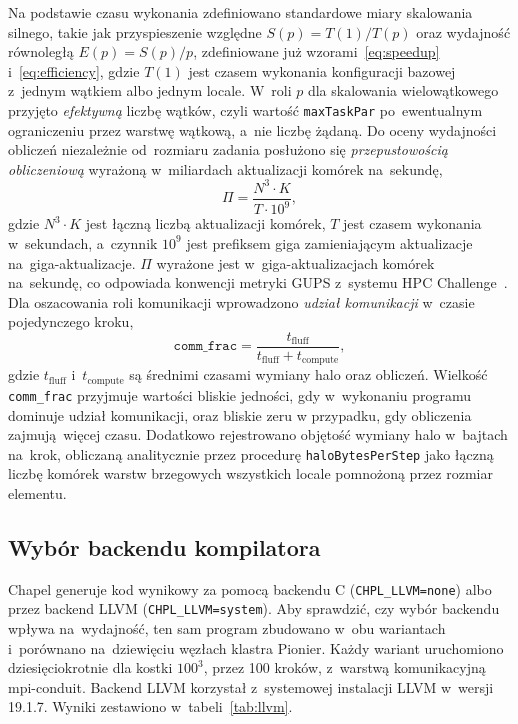 Na podstawie czasu wykonania zdefiniowano standardowe miary skalowania silnego, takie jak
przyspieszenie względne $S(p)=T(1)/T(p)$ oraz wydajność równoległą $E(p)=S(p)/p$, zdefiniowane już
wzorami~\eqref{eq:speedup} i~\eqref{eq:efficiency}, gdzie $T(1)$ jest czasem wykonania konfiguracji
bazowej z~jednym wątkiem albo jednym locale.
W~roli $p$ dla skalowania wielowątkowego przyjęto \emph{efektywną} liczbę wątków,
czyli wartość \texttt{maxTaskPar} po~ewentualnym ograniczeniu przez warstwę wątkową, a~nie liczbę
żądaną. Do oceny wydajności obliczeń niezależnie od~rozmiaru zadania posłużono się
\emph{przepustowością obliczeniową} wyrażoną w~miliardach aktualizacji komórek na~sekundę,
\begin{equation}
  \Pi = \frac{N^3 \cdot K}{T \cdot 10^{9}},
  \label{eq:throughput}
\end{equation}
gdzie $N^3 \cdot K$ jest łączną liczbą aktualizacji komórek,
$T$ jest czasem wykonania w~sekundach, a~czynnik $10^{9}$ jest prefiksem giga
zamieniającym aktualizacje na~giga-aktualizacje. $\Pi$ wyrażone jest
w~giga-aktualizacjach komórek na~sekundę, co odpowiada konwencji metryki GUPS z~systemu
HPC Challenge~\cite{hpcchallenge}. Dla oszacowania roli
komunikacji wprowadzono \emph{udział komunikacji} w~czasie pojedynczego kroku,
\begin{equation}
  \texttt{comm\_frac} = \frac{t_{\text{fluff}}}{t_{\text{fluff}} + t_{\text{compute}}},
  \label{eq:commfrac}
\end{equation}
gdzie $t_{\text{fluff}}$ i~$t_{\text{compute}}$ są średnimi czasami wymiany halo
oraz obliczeń. Wielkość \texttt{comm\_frac} przyjmuje wartości bliskie jedności, gdy w~wykonaniu programu dominuje udział komunikacji,
oraz bliskie zeru w przypadku, gdy obliczenia zajmują więcej czasu. Dodatkowo rejestrowano objętość wymiany halo
w~bajtach na~krok, obliczaną analitycznie przez procedurę \texttt{haloBytesPerStep} jako łączną
liczbę komórek warstw brzegowych wszystkich locale pomnożoną przez rozmiar elementu.

\subsection{Wybór backendu kompilatora}
\label{sec:backend}

Chapel generuje kod wynikowy za pomocą backendu C (\texttt{CHPL\_LLVM=none})
albo przez backend LLVM (\texttt{CHPL\_LLVM=system}). Aby sprawdzić, czy wybór backendu wpływa
na~wydajność, ten sam program zbudowano w~obu wariantach
i~porównano na~dziewięciu węzłach klastra Pionier. Każdy wariant uruchomiono dziesięciokrotnie
dla kostki $100^3$, przez \num{100} kroków, z~warstwą komunikacyjną mpi-conduit. Backend LLVM
korzystał z~systemowej instalacji LLVM w~wersji 19.1.7. Wyniki zestawiono w~tabeli~\ref{tab:llvm}.

